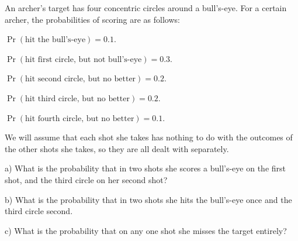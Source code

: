 \documentclass[12pt]{amsart}
\theoremstyle{definition}
\begin{document}
An archer's target has four concentric circles around a bull's-eye. For a certain archer, the probabilities of scoring are as follows:
\begin{compactitem}
\item $\Pr(\text{hit the bull's-eye}) = 0.1$.
\item $\Pr(\text{hit first circle, but not bull's-eye}) = 0.3$.
\item $\Pr(\text{hit second circle, but no better}) = 0.2$.
\item $\Pr(\text{hit third circle, but no better}) = 0.2$.
\item $\Pr(\text{hit fourth circle, but no better}) = 0.1$.
\end{compactitem}
We will assume that each shot she takes has nothing to do with the outcomes of the other shots she takes, so they are all dealt with separately.
\begin{compactitem}
\item[a)] What is the probability that in two shots she scores a bull's-eye on the first shot, and the third circle on her second shot?
\item[b)] What is the probability that in two shots she hits the bull's-eye once and the third circle second.
\item[c)] What is the probability that on any one shot she misses the target entirely?
\end{compactitem}
\end{document}
